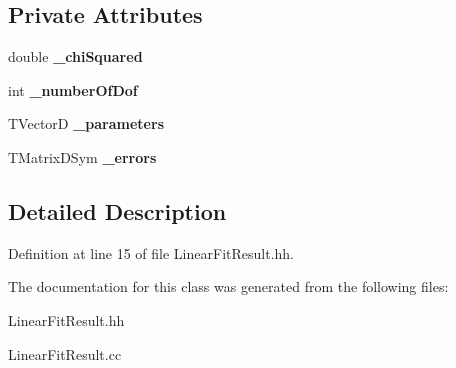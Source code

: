 \subsection*{Private Attributes}
\begin{DoxyCompactItemize}
\item 
double {\bfseries \-\_\-chi\-Squared}\label{classTBTrack_1_1LinearFitResult_a009140f1916c5f9fffbdde89e000fe94}

\item 
int {\bfseries \-\_\-number\-Of\-Dof}\label{classTBTrack_1_1LinearFitResult_a2a4b4553ede2fc2363e4beab085404c8}

\item 
T\-Vector\-D {\bfseries \-\_\-parameters}\label{classTBTrack_1_1LinearFitResult_aab3a876556b7afa7eb0492e30a51b56d}

\item 
T\-Matrix\-D\-Sym {\bfseries \-\_\-errors}\label{classTBTrack_1_1LinearFitResult_a71acc0645f990d05042ccd962cf36ef7}

\end{DoxyCompactItemize}


\subsection{Detailed Description}


Definition at line 15 of file Linear\-Fit\-Result.\-hh.



The documentation for this class was generated from the following files\-:\begin{DoxyCompactItemize}
\item 
Linear\-Fit\-Result.\-hh\item 
Linear\-Fit\-Result.\-cc\end{DoxyCompactItemize}
